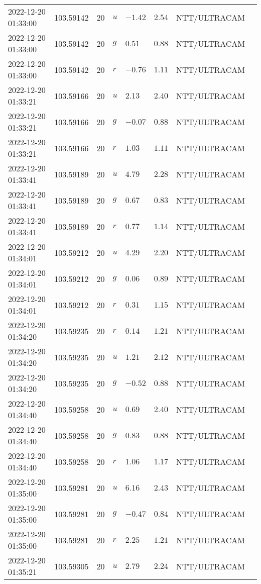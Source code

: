 \documentclass{nature_plusfigure}
\begin{document}
\begin{supplement}
\begin{center}
\begin{longtable}{llllllll}
2022-12-20 01:33:00 & 103.59142 & 20 & $u$ & $-1.42$ & $2.54$ & NTT/ULTRACAM &  \\ 
2022-12-20 01:33:00 & 103.59142 & 20 & $g$ & $0.51$ & $0.88$ & NTT/ULTRACAM &  \\ 
2022-12-20 01:33:00 & 103.59142 & 20 & $r$ & $-0.76$ & $1.11$ & NTT/ULTRACAM &  \\ 
2022-12-20 01:33:21 & 103.59166 & 20 & $u$ & $2.13$ & $2.40$ & NTT/ULTRACAM &  \\ 
2022-12-20 01:33:21 & 103.59166 & 20 & $g$ & $-0.07$ & $0.88$ & NTT/ULTRACAM &  \\ 
2022-12-20 01:33:21 & 103.59166 & 20 & $r$ & $1.03$ & $1.11$ & NTT/ULTRACAM &  \\ 
2022-12-20 01:33:41 & 103.59189 & 20 & $u$ & $4.79$ & $2.28$ & NTT/ULTRACAM &  \\ 
2022-12-20 01:33:41 & 103.59189 & 20 & $g$ & $0.67$ & $0.83$ & NTT/ULTRACAM &  \\ 
2022-12-20 01:33:41 & 103.59189 & 20 & $r$ & $0.77$ & $1.14$ & NTT/ULTRACAM &  \\ 
2022-12-20 01:34:01 & 103.59212 & 20 & $u$ & $4.29$ & $2.20$ & NTT/ULTRACAM &  \\ 
2022-12-20 01:34:01 & 103.59212 & 20 & $g$ & $0.06$ & $0.89$ & NTT/ULTRACAM &  \\ 
2022-12-20 01:34:01 & 103.59212 & 20 & $r$ & $0.31$ & $1.15$ & NTT/ULTRACAM &  \\ 
2022-12-20 01:34:20 & 103.59235 & 20 & $r$ & $0.14$ & $1.21$ & NTT/ULTRACAM &  \\ 
2022-12-20 01:34:20 & 103.59235 & 20 & $u$ & $1.21$ & $2.12$ & NTT/ULTRACAM &  \\ 
2022-12-20 01:34:20 & 103.59235 & 20 & $g$ & $-0.52$ & $0.88$ & NTT/ULTRACAM &  \\ 
2022-12-20 01:34:40 & 103.59258 & 20 & $u$ & $0.69$ & $2.40$ & NTT/ULTRACAM &  \\ 
2022-12-20 01:34:40 & 103.59258 & 20 & $g$ & $0.83$ & $0.88$ & NTT/ULTRACAM &  \\ 
2022-12-20 01:34:40 & 103.59258 & 20 & $r$ & $1.06$ & $1.17$ & NTT/ULTRACAM &  \\ 
2022-12-20 01:35:00 & 103.59281 & 20 & $u$ & $6.16$ & $2.43$ & NTT/ULTRACAM &  \\ 
2022-12-20 01:35:00 & 103.59281 & 20 & $g$ & $-0.47$ & $0.84$ & NTT/ULTRACAM &  \\ 
2022-12-20 01:35:00 & 103.59281 & 20 & $r$ & $2.25$ & $1.21$ & NTT/ULTRACAM &  \\ 
2022-12-20 01:35:21 & 103.59305 & 20 & $u$ & $2.79$ & $2.24$ & NTT/ULTRACAM &  \\ 

\end{longtable}
\end{center}
\end{supplement}
\end{document}
